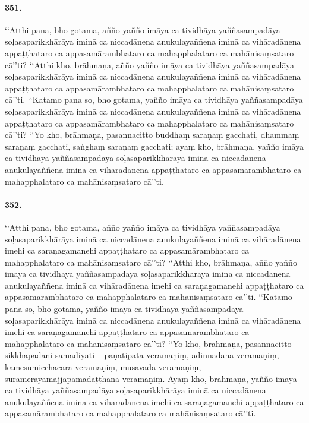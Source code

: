 \paragraph{351.} ‘‘Atthi pana, bho gotama, añño yañño imāya ca tividhāya yaññasampadāya soḷasaparikkhārāya iminā ca niccadānena anukulayaññena iminā ca vihāradānena appaṭṭhataro ca appasamārambhataro ca mahapphalataro ca mahānisaṃsataro cā’’ti? ‘‘Atthi kho, brāhmaṇa, añño yañño imāya ca tividhāya yaññasampadāya soḷasaparikkhārāya iminā ca niccadānena anukulayaññena iminā ca vihāradānena appaṭṭhataro ca appasamārambhataro ca mahapphalataro ca mahānisaṃsataro cā’’ti. ‘‘Katamo pana so, bho gotama, yañño imāya ca tividhāya yaññasampadāya soḷasaparikkhārāya iminā ca niccadānena anukulayaññena iminā ca vihāradānena appaṭṭhataro ca appasamārambhataro ca mahapphalataro ca mahānisaṃsataro cā’’ti? ‘‘Yo kho, brāhmaṇa, pasannacitto buddhaṃ saraṇaṃ gacchati, dhammaṃ saraṇaṃ gacchati, saṅghaṃ saraṇaṃ gacchati; ayaṃ kho, brāhmaṇa, yañño imāya ca tividhāya yaññasampadāya soḷasaparikkhārāya iminā ca niccadānena anukulayaññena iminā ca vihāradānena appaṭṭhataro ca appasamārambhataro ca mahapphalataro ca mahānisaṃsataro cā’’ti.

\paragraph{352.} ‘‘Atthi pana, bho gotama, añño yañño imāya ca tividhāya yaññasampadāya soḷasaparikkhārāya iminā ca niccadānena anukulayaññena iminā ca vihāradānena imehi ca saraṇagamanehi appaṭṭhataro ca appasamārambhataro ca mahapphalataro ca mahānisaṃsataro cā’’ti? ‘‘Atthi kho, brāhmaṇa, añño yañño imāya ca tividhāya yaññasampadāya soḷasaparikkhārāya iminā ca niccadānena anukulayaññena iminā ca vihāradānena imehi ca saraṇagamanehi appaṭṭhataro ca appasamārambhataro ca mahapphalataro ca mahānisaṃsataro cā’’ti. ‘‘Katamo pana so, bho gotama, yañño imāya ca tividhāya yaññasampadāya soḷasaparikkhārāya iminā ca niccadānena anukulayaññena iminā ca vihāradānena imehi ca saraṇagamanehi appaṭṭhataro ca appasamārambhataro ca mahapphalataro ca mahānisaṃsataro cā’’ti? ‘‘Yo kho, brāhmaṇa, pasannacitto sikkhāpadāni samādiyati – pāṇātipātā veramaṇiṃ, adinnādānā veramaṇiṃ, kāmesumicchācārā veramaṇiṃ, musāvādā veramaṇiṃ, surāmerayamajjapamādaṭṭhānā veramaṇiṃ. Ayaṃ kho, brāhmaṇa, yañño imāya ca tividhāya yaññasampadāya soḷasaparikkhārāya iminā ca niccadānena anukulayaññena iminā ca vihāradānena imehi ca saraṇagamanehi appaṭṭhataro ca appasamārambhataro ca mahapphalataro ca mahānisaṃsataro cā’’ti.

